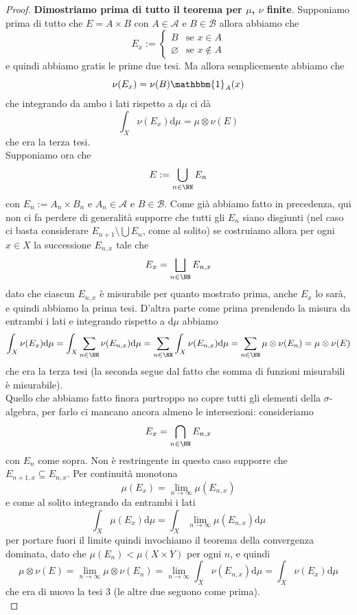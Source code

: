 \documentclass[11pt]{scrartcl}
\newcommand{\dif}{\text{d}}
\newcommand{\eset}{\varnothing}
\begin{document}
	\begin{proof}
		\textbf{Dimostriamo prima di tutto il teorema per $\mu$, $\nu$ finite}.
		Supponiamo prima di tutto che $E=A\times B$ con $A\in \mathcal{A}$ e $B\in \mathcal{B}$ allora abbiamo che
		$$E_x:=\begin{cases}
			B & \text{se $x\in A$} \\
			\eset & \text{se $x\not\in A$}
		\end{cases}$$
		e quindi abbiamo gratis le prime due tesi. Ma allora semplicemente abbiamo che
		$$\nu(E_x)=\nu(B)\mathbbm{1}_A(x)$$
		che integrando da ambo i lati rispetto a $\dif\mu$ ci dà
		$$\int_X\nu(E_x)\dif \mu =\mu\otimes \nu (E)$$
		che era la terza tesi. \\
		Supponiamo ora che
		$$E:=\bigcup_{n\in\NN}E_n$$
		con $E_n:=A_n\times B_n$ e $A_n\in \mathcal{A}$ e $B\in \mathcal{B}$. Come già abbiamo fatto in precedenza, qui non ci fa perdere di generalità supporre che tutti gli $E_n$ siano disgiunti (nel caso ci basta considerare $E_{n+1}\setminus \bigcup E_n$, come al solito) se costruiamo allora per ogni $x\in X$ la successione $E_{n,x}$ tale che
		$$E_x=\bigsqcup_{n\in\NN}E_{n,x}$$
		dato che ciascun $E_{n,x}$ è misurabile per quanto mostrato prima, anche $E_x$ lo sarà, e quindi abbiamo la prima tesi. D'altra parte come prima prendendo la misura da entrambi i lati e integrando rispetto a $\dif\mu $ abbiamo
		$$\int_X \nu(E_x)\dif \mu = \int_X \sum_{n\in\NN}\nu(E_{n,x})\dif \mu=\sum_{n\in\NN}\int_X\nu(E_{n,x})\dif \mu =\sum_{n\in\NN}\mu\otimes \nu(E_n)=\mu \otimes \nu (E)$$
		che era la terza tesi (la seconda segue dal fatto che somma di funzioni misurabili è misurabile). \\
		Quello che abbiamo fatto finora purtroppo no copre tutti gli elementi della $\sigma$-algebra, per farlo ci mancano ancora almeno le intersezioni: consideriamo
		$$E_x=\bigcap_{n\in\NN}E_{n,x}$$
		con $E_n$ come sopra. Non è restringente in questo caso supporre che $E_{n+1,x}\subseteq E_{n,x}$. Per continuità monotona
		$$\mu(E_x)=\lim_{n\to\infty}\mu(E_{n,x})$$
		e come al solito integrando da entrambi i lati
		$$\int_X \mu(E_x)\dif \mu = \int_X \lim_{n\to\infty}\mu(E_{n,x})\dif \mu $$
		per portare fuori il limite quindi invochiamo il teorema della convergenza dominata, dato che $\mu(E_n)<\mu(X\times Y)$ per ogni $n$, e quindi
		$$\mu\otimes \nu (E)=\lim_{n\to\infty}\mu\otimes \nu(E_n)=\lim_{n\to\infty}\int_X\nu(E_{n,x})\dif \mu=\int_X \nu(E_x)\dif \mu$$
		che era di nuovo la tesi $3$ (le altre due seguono come prima). \\

\end{proof}
\end{document}
